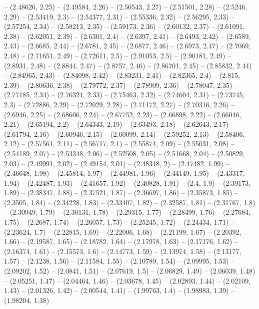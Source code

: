 -- (2.48626, 2.25)
-- (2.49584, 2.26)
-- (2.50543, 2.27)
-- (2.51501, 2.28)
-- (2.5246, 2.29)
-- (2.53419, 2.3)
-- (2.54377, 2.31)
-- (2.55336, 2.32)
-- (2.56295, 2.33)
-- (2.57254, 2.34)
-- (2.58213, 2.35)
-- (2.59173, 2.36)
-- (2.60132, 2.37)
-- (2.61091, 2.38)
-- (2.62051, 2.39)
-- (2.6301, 2.4)
-- (2.6397, 2.41)
-- (2.6493, 2.42)
-- (2.6589, 2.43)
-- (2.6685, 2.44)
-- (2.6781, 2.45)
-- (2.6877, 2.46)
-- (2.6973, 2.47)
-- (2.7069, 2.48)
-- (2.71651, 2.49)
-- (2.72611, 2.5)
-- (2.91053, 2.5)
-- (2.90181, 2.49)
-- (2.8931, 2.48)
-- (2.8844, 2.47)
-- (2.8757, 2.46)
-- (2.86701, 2.45)
-- (2.85832, 2.44)
-- (2.84965, 2.43)
-- (2.84098, 2.42)
-- (2.83231, 2.41)
-- (2.82365, 2.4)
-- (2.815, 2.39)
-- (2.80636, 2.38)
-- (2.79772, 2.37)
-- (2.78909, 2.36)
-- (2.78047, 2.35)
-- (2.77185, 2.34)
-- (2.76324, 2.33)
-- (2.75463, 2.32)
-- (2.74604, 2.31)
-- (2.73745, 2.3)
-- (2.72886, 2.29)
-- (2.72029, 2.28)
-- (2.71172, 2.27)
-- (2.70316, 2.26)
-- (2.6946, 2.25)
-- (2.68606, 2.24)
-- (2.67752, 2.23)
-- (2.66898, 2.22)
-- (2.66046, 2.21)
-- (2.65194, 2.2)
-- (2.64343, 2.19)
-- (2.63493, 2.18)
-- (2.62643, 2.17)
-- (2.61794, 2.16)
-- (2.60946, 2.15)
-- (2.60099, 2.14)
-- (2.59252, 2.13)
-- (2.58406, 2.12)
-- (2.57561, 2.11)
-- (2.56717, 2.1)
-- (2.55874, 2.09)
-- (2.55031, 2.08)
-- (2.54189, 2.07)
-- (2.53348, 2.06)
-- (2.52508, 2.05)
-- (2.51668, 2.04)
-- (2.50829, 2.03)
-- (2.49991, 2.02)
-- (2.49154, 2.01)
-- (2.48318, 2)
-- (2.47482, 1.99)
-- (2.46648, 1.98)
-- (2.45814, 1.97)
-- (2.44981, 1.96)
-- (2.44149, 1.95)
-- (2.43317, 1.94)
-- (2.42487, 1.93)
-- (2.41657, 1.92)
-- (2.40828, 1.91)
-- (2.4, 1.9)
-- (2.39173, 1.89)
-- (2.38347, 1.88)
-- (2.37521, 1.87)
-- (2.36697, 1.86)
-- (2.35873, 1.85)
-- (2.3505, 1.84)
-- (2.34228, 1.83)
-- (2.33407, 1.82)
-- (2.32587, 1.81)
-- (2.31767, 1.8)
-- (2.30949, 1.79)
-- (2.30131, 1.78)
-- (2.29315, 1.77)
-- (2.28499, 1.76)
-- (2.27684, 1.75)
-- (2.2687, 1.74)
-- (2.26057, 1.73)
-- (2.25245, 1.72)
-- (2.24434, 1.71)
-- (2.23624, 1.7)
-- (2.22815, 1.69)
-- (2.22006, 1.68)
-- (2.21199, 1.67)
-- (2.20392, 1.66)
-- (2.19587, 1.65)
-- (2.18782, 1.64)
-- (2.17978, 1.63)
-- (2.17176, 1.62)
-- (2.16374, 1.61)
-- (2.15573, 1.6)
-- (2.14773, 1.59)
-- (2.13974, 1.58)
-- (2.13177, 1.57)
-- (2.1238, 1.56)
-- (2.11584, 1.55)
-- (2.10789, 1.54)
-- (2.09995, 1.53)
-- (2.09202, 1.52)
-- (2.0841, 1.51)
-- (2.07619, 1.5)
-- (2.06829, 1.49)
-- (2.06039, 1.48)
-- (2.05251, 1.47)
-- (2.04464, 1.46)
-- (2.03678, 1.45)
-- (2.02893, 1.44)
-- (2.02109, 1.43)
-- (2.01326, 1.42)
-- (2.00544, 1.41)
-- (1.99763, 1.4)
-- (1.98983, 1.39)
-- (1.98204, 1.38)
